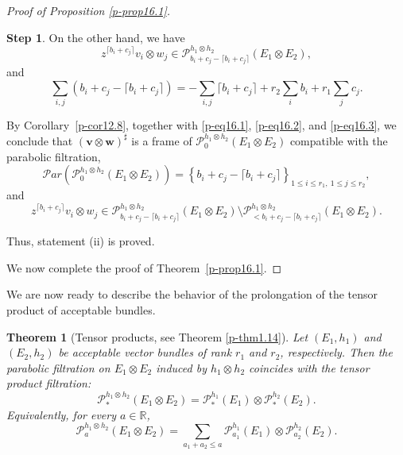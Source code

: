 \documentclass[12pt,twoside]{amsart}
\newtheorem{thm}{Theorem}[section]
\theoremstyle{definition}
\newtheorem{step}{Step}
\begin{document}
\begin{proof}[Proof of Proposition \ref{p-prop16.1}]
\begin{step}
On the other hand, we have
\begin{equation}\label{p-eq16.2}
z^{\lceil b_i + c_j \rceil} v_i \otimes w_j \in 
\mathcal{P}^{h_1 \otimes h_2}_{b_i + c_j - \lceil b_i + c_j \rceil}(E_1 \otimes E_2),
\end{equation}
and
\begin{equation}\label{p-eq16.3}
\sum_{i,j} \left( b_i + c_j - \lceil b_i + c_j \rceil \right)
= -\sum_{i,j} \lceil b_i + c_j \rceil + r_2 \sum_i b_i + r_1 \sum_j c_j.
\end{equation}

By Corollary~\ref{p-cor12.8}, together with \eqref{p-eq16.1}, 
\eqref{p-eq16.2}, and \eqref{p-eq16.3}, 
we conclude that $\left(\bm v \otimes \bm w\right)^\sharp$ is a frame of 
$\mathcal{P}^{h_1 \otimes h_2}_0(E_1 \otimes E_2)$ compatible with the parabolic filtration, 
\[
\mathcal{P}ar\left( \mathcal{P}^{h_1 \otimes h_2}_0(E_1 \otimes E_2) \right) 
= \left\{ b_i + c_j - \lceil b_i + c_j \rceil \right\}_{1 \leq i \leq r_1,\ 1 \leq j \leq r_2},
\]
and
\[
z^{\lceil b_i + c_j \rceil} v_i \otimes w_j \in 
\mathcal{P}^{h_1 \otimes h_2}_{b_i + c_j - \lceil b_i + c_j \rceil}(E_1 \otimes E_2)
\setminus 
\mathcal{P}^{h_1 \otimes h_2}_{< b_i + c_j - \lceil b_i + c_j \rceil}(E_1 \otimes E_2).
\]

Thus, statement (ii) is proved.
\end{step}

We now complete the proof of Theorem~\ref{p-prop16.1}.
\end{proof}

We are now ready 
to describe the behavior of the prolongation of the tensor product of acceptable bundles.

\begin{thm}[Tensor products, see Theorem \ref{p-thm1.14}]\label{p-thm16.2}
Let $(E_1, h_1)$ and $(E_2, h_2)$ be 
acceptable vector bundles of rank $r_1$ and $r_2$, respectively. 
Then the parabolic filtration on $E_1\otimes E_2$ induced 
by $h_1\otimes h_2$ coincides with the tensor product filtration:
\[
\mathcal{P}^{h_1 \otimes h_2}_\ast(E_1 \otimes E_2)
= \mathcal{P}^{h_1}_\ast(E_1) \otimes \mathcal{P}^{h_2}_\ast(E_2).
\]
Equivalently, for every \( a \in \mathbb{R} \),
\[
\mathcal P^{h_1 \otimes h_2}_a(E_1 \otimes E_2) 
= \sum_{a_1 + a_2 \leq a} \mathcal P^{h_1}_{a_1}(E_1) \otimes 
\mathcal P^{h_2}_{a_2}(E_2).
\]
\end{thm}
\end{document}
